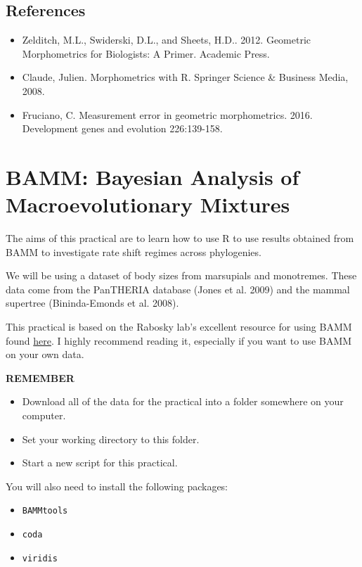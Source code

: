 \documentclass[]{book}
\providecommand{\tightlist}{%
  \setlength{\itemsep}{0pt}\setlength{\parskip}{0pt}}
\begin{document}
\section{References}\label{references-4}

\begin{itemize}
\tightlist
\item
  Zelditch, M.L., Swiderski, D.L., and Sheets, H.D.. 2012. Geometric
  Morphometrics for Biologists: A Primer. Academic Press.
\item
  Claude, Julien. Morphometrics with R. Springer Science \& Business
  Media, 2008.
\item
  Fruciano, C. Measurement error in geometric morphometrics. 2016.
  Development genes and evolution 226:139-158.
\end{itemize}

\chapter{BAMM: Bayesian Analysis of Macroevolutionary
Mixtures}\label{bamm-bayesian-analysis-of-macroevolutionary-mixtures}

The aims of this practical are to learn how to use R to use results
obtained from BAMM to investigate rate shift regimes across phylogenies.

We will be using a dataset of body sizes from marsupials and monotremes.
These data come from the PanTHERIA database (Jones et al. 2009) and the
mammal supertree (Bininda-Emonds et al. 2008).

This practical is based on the Rabosky lab's excellent resource for
using BAMM found \href{http://bamm-project.org/index.html}{here}. I
highly recommend reading it, especially if you want to use BAMM on your
own data.

\textbf{REMEMBER}

\begin{itemize}
\tightlist
\item
  Download all of the data for the practical into a folder somewhere on
  your computer.
\item
  Set your working directory to this folder.
\item
  Start a new script for this practical.
\end{itemize}

You will also need to install the following packages:

\begin{itemize}
\tightlist
\item
  \texttt{BAMMtools}
\item
  \texttt{coda}
\item
  \texttt{viridis}
\end{itemize}
\end{document}
